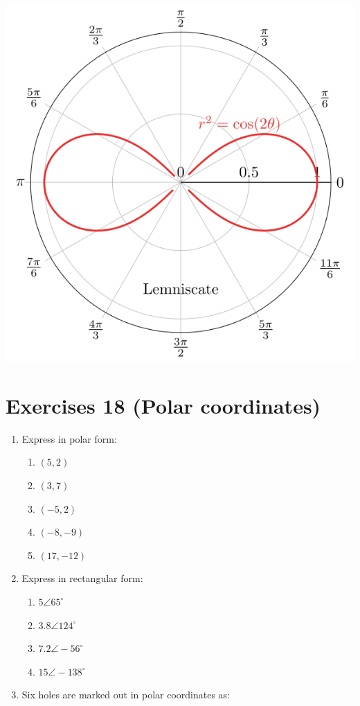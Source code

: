 \documentclass[
  12pt,
  oneside]{book}
\providecommand{\tightlist}{%
  \setlength{\itemsep}{0pt}\setlength{\parskip}{0pt}}
\theoremstyle{definition}
\theoremstyle{definition}
\theoremstyle{definition}
\theoremstyle{definition}
\theoremstyle{remark}
\begin{document}
\begin{center}\includegraphics{t18-polar-pics-8} \end{center}

\hypertarget{exercises-18-polar-coordinates}{%
\chapter*{Exercises 18 (Polar coordinates)}\label{exercises-18-polar-coordinates}}

\begin{enumerate}
\def\labelenumi{\arabic{enumi}.}
\item
  Express in polar form:

  \begin{enumerate}
  \def\labelenumii{\roman{enumii})}
  \tightlist
  \item
    \((5, 2)\)
  \item
    \((3, 7)\)
  \item
    \((-5, 2)\)
  \item
    \((-8, -9)\)
  \item
    \((17, -12)\)
  \end{enumerate}
\item
  Express in rectangular form:

  \begin{enumerate}
  \def\labelenumii{\roman{enumii})}
  \tightlist
  \item
    \(5 \angle 65^\circ\)
  \item
    \(3.8 \angle 124^\circ\)
  \item
    \(7.2 \angle -56^\circ\)
  \item
    \(15 \angle -138^\circ\)
  \end{enumerate}
\item
  Six holes are marked out in polar coordinates as:
\end{enumerate}
\end{document}
